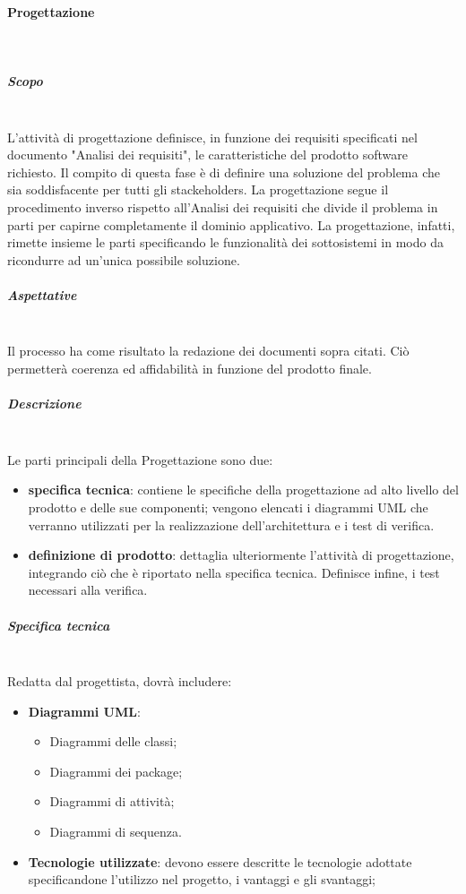 \begin{itemize}
\paragraph{Progettazione} \mbox{}\\
\subparagraph{Scopo} \mbox{}\\
L'attività di progettazione definisce, in funzione dei requisiti specificati nel documento "Analisi dei requisiti", le caratteristiche del prodotto software richiesto. Il compito di questa fase è di definire una soluzione del problema che sia soddisfacente per tutti gli stackeholders. La progettazione segue il procedimento inverso rispetto all'Analisi dei requisiti che divide il problema in parti per capirne completamente il dominio applicativo. La progettazione, infatti, rimette insieme le parti specificando le funzionalità dei sottosistemi in modo da ricondurre ad un'unica possibile soluzione.
\subparagraph{Aspettative} \mbox{}\\
Il processo ha come risultato la redazione dei documenti sopra citati. Ciò permetterà
coerenza ed affidabilità in funzione del prodotto finale.
\subparagraph{Descrizione} \mbox{}\\
Le parti principali della Progettazione sono due:
\begin{itemize}
	\item \textbf{specifica tecnica}: contiene le specifiche della progettazione ad alto livello del prodotto e delle sue componenti; vengono elencati i diagrammi UML che verranno utilizzati per la realizzazione dell'architettura e i test di verifica.
	\item \textbf{definizione di prodotto}: dettaglia ulteriormente l'attività di progettazione, integrando ciò che è riportato nella specifica tecnica. Definisce infine, i test necessari alla verifica.
\end{itemize}
\subparagraph{Specifica tecnica} \mbox{}\\
Redatta dal progettista, dovrà includere:
\begin{itemize}
	\item \textbf{Diagrammi UML}:
	\begin{itemize}
		\item Diagrammi delle classi;
		\item Diagrammi dei package;
		\item Diagrammi di attività;
		\item Diagrammi di sequenza.
	\end{itemize}
	\item \textbf{Tecnologie utilizzate}: devono essere descritte le tecnologie adottate specificandone l'utilizzo nel progetto, i vantaggi e gli svantaggi;

\end{itemize}
\end{itemize}
